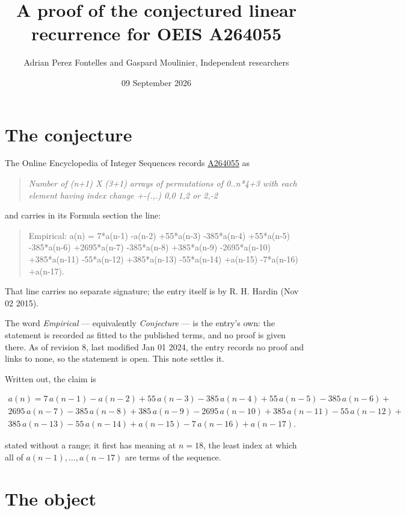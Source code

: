 \documentclass[11pt]{article}
\title{A proof of the conjectured linear recurrence for OEIS A264055}
\author{Adrian Perez Fontelles and Gaspard Moulinier, Independent researchers}
\date{09 September 2026}
\theoremstyle{definition}
\begin{document}
\maketitle
\section{The conjecture}

The Online Encyclopedia of Integer Sequences records \href{https://oeis.org/A264055}{A264055} as

\begin{quote}\itshape Number of (n+1) X (3+1) arrays of permutations of 0..n*4+3 with each element having index change +-(.,.) 0,0 1,2 or 2,-2\end{quote}

and carries in its Formula section the line:

\begin{quote}\ttfamily Empirical: a(n) = 7*a(n-1) -a(n-2) +55*a(n-3) -385*a(n-4) +55*a(n-5) -385*a(n-6) +2695*a(n-7) -385*a(n-8) +385*a(n-9) -2695*a(n-10) +385*a(n-11) -55*a(n-12) +385*a(n-13) -55*a(n-14) +a(n-15) -7*a(n-16) +a(n-17).\end{quote}

That line carries no separate signature; the entry itself is by R. H. Hardin (Nov 02 2015).

The word {\itshape Empirical} --- equivalently {\itshape Conjecture} --- is the entry's own: the statement is recorded as fitted to the published terms, and no proof is given there. As of revision 8, last modified Jan 01 2024, the entry records no proof and links to none, so the statement is open. This note settles it.

Written out, the claim is

\begin{multline*} a(n) = 7\,a(n-1) - a(n-2) + 55\,a(n-3) - 385\,a(n-4) + 55\,a(n-5) - 385\,a(n-6) + \\ 2695\,a(n-7) - 385\,a(n-8) + 385\,a(n-9) - 2695\,a(n-10) + 385\,a(n-11) - 55\,a(n-12) + \\ 385\,a(n-13) - 55\,a(n-14) + a(n-15) - 7\,a(n-16) + a(n-17). \end{multline*}

stated without a range; it first has meaning at $n = 18$, the least index at which all of $a(n-1),\dots,a(n-17)$ are terms of the sequence.

\section{The object}
\end{document}
